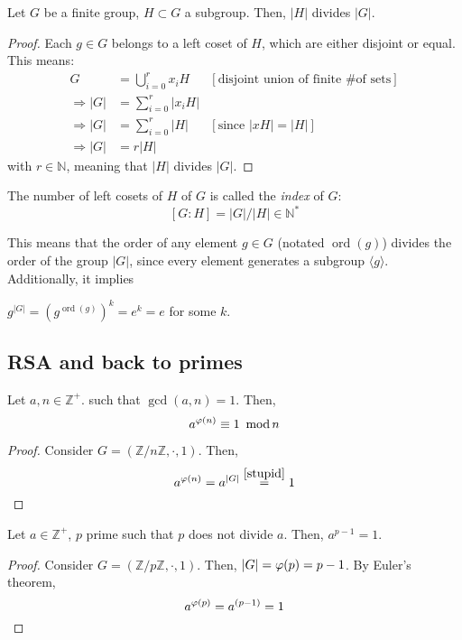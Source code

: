 \begin{theorem}
  Let $G$ be a finite group, $H \subset G$ a subgroup. Then, $|H|$ divides $|G|$.
\end{theorem}
\begin{proof}
  Each $g \in G$ belongs to a left coset of $H$, which are either disjoint or equal. This means:
  \begin{align*}
    G &= \bigcup_{i = 0}^{r}x_iH &[\text{disjoint union of finite \# of sets}] \\
    \Rightarrow |G| &= \sum_{i = 0}^r |x_iH| &\\
    \Rightarrow |G| &= \sum_{i = 0}^r |H| &[\text{since } |xH| = |H|] \\
    \Rightarrow |G| &= r|H| &
  \end{align*}
  with $r \in \mathbb{N}$, meaning that $|H|$ divides $|G|$. 
\end{proof}

\begin{definition}
  The number of left cosets of $H$ of $G$ is called the \emph{index} of $G$: 
  \[
    [G : H] = |G|/|H| \in \mathbb{N}^*
  \]
\end{definition}

This means that the order of any element $g \in G$ (notated $\operatorname{ord}(g)$) divides the order of the group $|G|$, since every element generates a subgroup $\langle g \rangle$. Additionally, it implies 

\begin{corollary}\label{stupid}
  $g^{|G|} = (g^{\operatorname{ord}(g)})^{k} = e^k = e$ for some $k$.
\end{corollary}

\subsection{RSA and back to primes}

\begin{theorem}
  Let $a, n \in \mathbb{Z}^+$. such that $\gcd(a, n) = 1$. Then, \[ a^{\varphi(n)} \equiv 1 \ \operatorname{mod} n\]
\end{theorem}
\begin{proof}
  Consider $G = (\mathbb{Z}/n\mathbb{Z}, \cdot, 1)$. Then, 
  \[
    a^{\varphi(n)} = a^{|G|} \stackrel{\ref{stupid}}{=} 1
  \]
\end{proof}

\begin{theorem}
  Let $a \in \mathbb{Z}^+$, $p$ prime such that $p$ does not divide $a$. Then, $a^{p - 1} = 1$. 
\end{theorem}
\begin{proof}
  Consider $G = (\mathbb{Z}/p\mathbb{Z}, \cdot, 1)$. Then, $|G| = \varphi(p) = p - 1$. By Euler's theorem, \[a^{\varphi(p)} = a^{(p - 1)} = 1\]
\end{proof}

